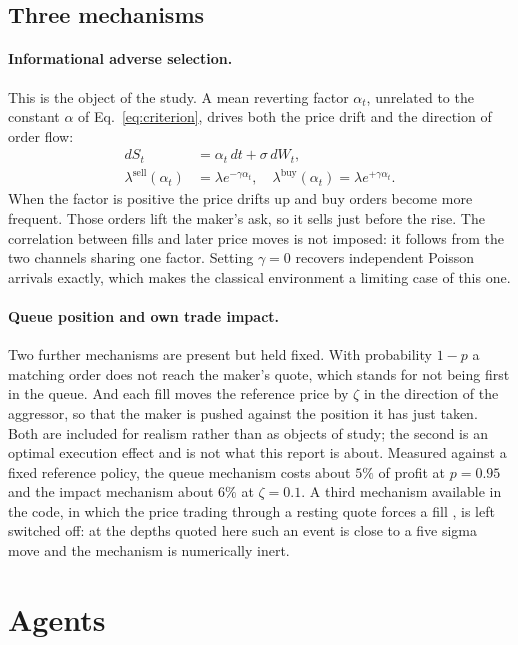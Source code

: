 \documentclass[10pt,twocolumn]{article}
\begin{document}
\subsection{Three mechanisms}
\label{sec:mechanisms}

\paragraph{Informational adverse selection.}
This is the object of the study. A mean reverting factor $\alpha_t$, unrelated to the constant $\alpha$ of
Eq.~\eqref{eq:criterion}, drives both the price drift and the direction of order flow:
\begin{align}
dS_t &= \alpha_t\,dt + \sigma\,dW_t, \\
\lambda^{\text{sell}}(\alpha_t) &= \lambda e^{-\gamma \alpha_t}, \quad
\lambda^{\text{buy}}(\alpha_t) = \lambda e^{+\gamma \alpha_t}.
\end{align}
When the factor is positive the price drifts up and buy orders become more frequent. Those orders lift the maker's
ask, so it sells just before the rise. The correlation between fills and later price moves is not imposed: it
follows from the two channels sharing one factor. Setting $\gamma = 0$ recovers independent Poisson arrivals
exactly, which makes the classical environment a limiting case of this one.

\paragraph{Queue position and own trade impact.}
Two further mechanisms are present but held fixed. With probability $1-p$ a matching order does not reach the
maker's quote, which stands for not being first in the queue. And each fill moves the reference price by $\zeta$
in the direction of the aggressor, so that the maker is pushed against the position it has just taken. Both are
included for realism rather than as objects of study; the second is an optimal execution effect and is not what
this report is about. Measured against a fixed reference policy, the queue mechanism costs about $5\%$ of profit
at $p = 0.95$ and the impact mechanism about $6\%$ at $\zeta = 0.1$. A third mechanism available in the code, in
which the price trading through a resting quote forces a fill \citep{lalor2024adverse}, is left switched off: at
the depths quoted here such an event is close to a five sigma move and the mechanism is numerically inert.

\section{Agents}
\end{document}

